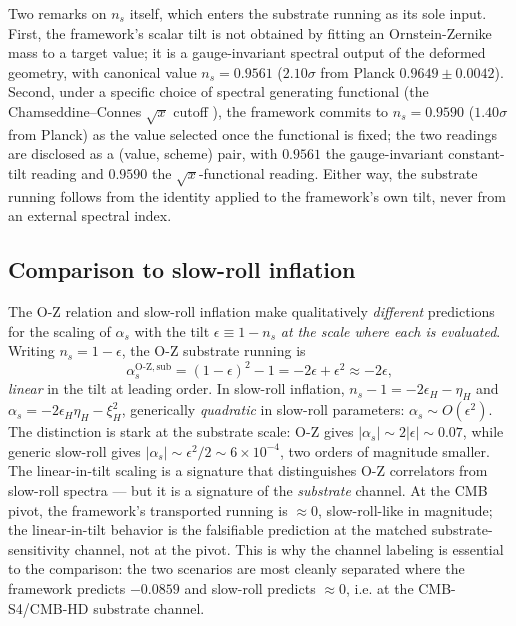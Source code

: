 \documentclass[12pt]{article}
\theoremstyle{definition}
\theoremstyle{remark}
\begin{document}
Two remarks on $n_s$ itself, which enters the substrate running as its sole input. First, the framework's scalar tilt is not obtained by fitting an Ornstein-Zernike mass to a target value; it is a gauge-invariant spectral output of the deformed geometry, with canonical value $n_s = 0.9561$ ($2.10\sigma$ from Planck $0.9649 \pm 0.0042$). Second, under a specific choice of spectral generating functional (the Chamseddine--Connes $\sqrt{x}$ cutoff \citep{ChamseddineConnes1997}), the framework commits to $n_s = 0.9590$ ($1.40\sigma$ from Planck) as the value selected once the functional is fixed; the two readings are disclosed as a (value, scheme) pair, with $0.9561$ the gauge-invariant constant-tilt reading and $0.9590$ the $\sqrt{x}$-functional reading. Either way, the substrate running follows from the identity applied to the framework's own tilt, never from an external spectral index.

\subsection{Comparison to slow-roll inflation}

The O-Z relation and slow-roll inflation make qualitatively \emph{different} predictions for the scaling of $\alpha_s$ with the tilt $\epsilon \equiv 1 - n_s$ \emph{at the scale where each is evaluated}. Writing $n_s = 1 - \epsilon$, the O-Z substrate running is
\begin{equation}
  \alpha_s^{\mathrm{O\text{-}Z,sub}} = (1-\epsilon)^2 - 1 = -2\epsilon + \epsilon^2 \approx -2\epsilon,
\end{equation}
\emph{linear} in the tilt at leading order. In slow-roll inflation, $n_s - 1 = -2\epsilon_H - \eta_H$ and $\alpha_s = -2\epsilon_H \eta_H - \xi_H^2$, generically \emph{quadratic} in slow-roll parameters: $\alpha_s \sim O(\epsilon^2)$. The distinction is stark at the substrate scale: O-Z gives $|\alpha_s| \sim 2|\epsilon| \sim 0.07$, while generic slow-roll gives $|\alpha_s| \sim \epsilon^2/2 \sim 6 \times 10^{-4}$, two orders of magnitude smaller. The linear-in-tilt scaling is a signature that distinguishes O-Z correlators from slow-roll spectra --- but it is a signature of the \emph{substrate} channel. At the CMB pivot, the framework's transported running is $\approx 0$, slow-roll-like in magnitude; the linear-in-tilt behavior is the falsifiable prediction at the matched substrate-sensitivity channel, not at the pivot. This is why the channel labeling is essential to the comparison: the two scenarios are most cleanly separated where the framework predicts $-0.0859$ and slow-roll predicts $\approx 0$, i.e. at the CMB-S4/CMB-HD substrate channel.
\end{document}
